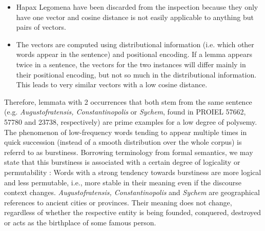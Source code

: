 \begin{itemize}
	\item Hapax Legomena have been discarded from the inspection because they only have one vector and cosine distance is not easily applicable to anything but pairs of vectors.
	\item The vectors are computed using distributional information (i.e. which other words appear in the sentence) and positional encoding. If a lemma appears twice in a sentence, the vectors for the two instances will differ mainly in their positional encoding, but not so much in the distributional information. This leads to very similar vectors with a low cosine distance.
\end{itemize}
Therefore, lemmata with 2 occurrences that both stem from the same sentence (e.g. \textit{Augustofratensis, Constantinopolis} or \textit{Sychem}, found in PROIEL 57662, 57780 and 23738, respectively) are prime examples for a low degree of polysemy. The phenomenon of low-frequency words tending to appear multiple times in quick succession (instead of a smooth distribution over the whole corpus) is referrd to as burstiness. Borrowing terminology from formal semantics, we may state that this burstiness is associated with a certain degree of logicality \parencite[178f.]{vonfintelFormalSemanticsGrammaticalization1995} or permutability \parencite[2]{altmannWordFrequencyBursts2009}: Words with a strong tendency towards burstiness are more logical and less permutable, i.e., more stable in their meaning even if the discourse context changes. \textit{Augustofratensis, Constantinopolis} and \textit{Sychem} are geographical references to ancient cities or provinces. Their meaning does not change, regardless of whether the respective entity is being founded, conquered, destroyed or acts as the birthplace of some famous person.

